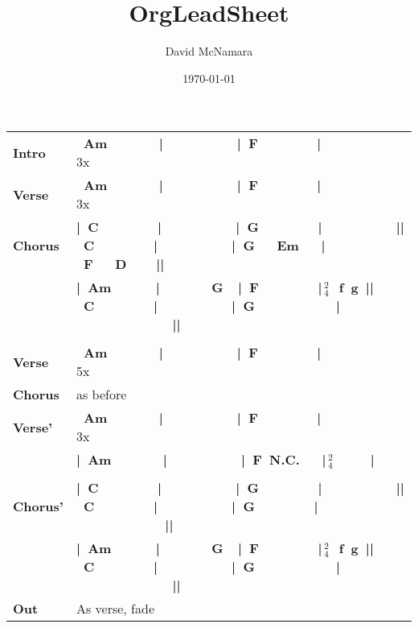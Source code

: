 \documentclass{LeadMemo}
\title{OrgLeadSheet}
\author{David McNamara}
\date{\today}
\newcommand{\rpt}{%
        \raisebox{.2ex}{:}%
        \raisebox{-.4ex}{\rule{.1ex}{2.5ex}\,\rule{.3ex}{2.5ex}}}
\newcommand{\rvrpt}{%
        \raisebox{-.4ex}{\rule{.3ex}{2.5ex}\,\rule{.1ex}{2.5ex}}%
        \raisebox{.2ex}{:}}
\newcommand{\chordstxt}[1]{%
    \large{\textbf{\textsf{#1}}}%
}
\begin{document}
\maketitle


\DefineShortVerb{\!}

\def\arraystretch{3}
\begin{tabular}[h]{ p{}  p{}  }
    \huge\textbf{Intro \vfill} & \chordstxt{\rvrpt~Am~~~~~~~|~~~~~~~~~~|~F~~~~~~~~|~~~~~~~~~~\rpt}  \large{3x} \\%

   \huge\textbf{Verse \vfill } & \chordstxt{\rvrpt~Am~~~~~~~|~~~~~~~~~~|~F~~~~~~~~|~~~~~~~~~~\rpt}  \large{3x} \\

   \huge\textbf{Chorus } & \chordstxt{|~C~~~~~~~~|~~~~~~~~~~|~G~~~~~~~~|~~~~~~~~~~||~C~~~~~~~~|~~~~~~~~~~|~G~~~Em~~~|~F~~~D~~~~||} \\
       \vfill            &  \chordstxt{|~Am~~~~~~|~~~~~~~G~~|~F~~~~~~~~|$\,^2_4\,$~f~g~||~C~~~~~~~~|~~~~~~~~~~|~G~~~~~~~~~~~|~~~~~~~~~~~~~||} \\
      \vfill & \\
    \huge\textbf{Verse \vfill } & \chordstxt{\rvrpt~Am~~~~~~~|~~~~~~~~~~|~F~~~~~~~~|~~~~~~~~~~\rpt}  \large{5x} \\
   \huge\textbf{Chorus \vfill} &  as before \\

    \huge\textbf{Verse' } & \chordstxt{\rvrpt~Am~~~~~~~|~~~~~~~~~~|~F~~~~~~~~|~~~~~~~~~~\rpt}  \large{3x} \\ %
                          \vfill &   \chordstxt{|~Am~~~~~~~|~~~~~~~~~~|~F~N.C.~~~|$\,^2_4$~~~~~|} \\ %
                          \vfill & \\ 
   \huge\textbf{Chorus' } &  \chordstxt{|~C~~~~~~~~|~~~~~~~~~~|~G~~~~~~~~|~~~~~~~~~~||~C~~~~~~~~|~~~~~~~~~~|~G~~~~~~~~|~~~~~~~~~~~~||} \\
       \vfill            &  \chordstxt{|~Am~~~~~~|~~~~~~~G~~|~F~~~~~~~~|$\,^2_4\,$~f~g~||~C~~~~~~~~|~~~~~~~~~~|~G~~~~~~~~~~~|~~~~~~~~~~~~~||} \\

    \huge\textbf{Out \vfill } & As verse, fade  \\

\end{tabular}
\def\arraystretch{4.0}
\end{document}
